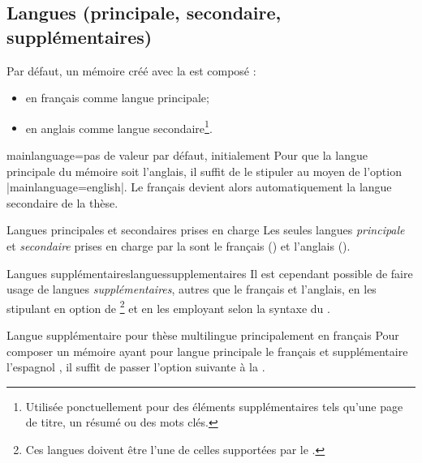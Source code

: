 %

\subsection{Langues (principale, secondaire,
  supplémentaires)}\label{sec-langues}

Par défaut, un mémoire créé avec la \yatCl est composé :
\begin{itemize}
\item en français comme langue principale;
\item en anglais comme langue secondaire\footnote{Utilisée ponctuellement pour
    des éléments supplémentaires tels qu'une page de titre, un résumé ou des
    mots clés.}.
\end{itemize}
%
\begin{docKey}{mainlanguage}{=\textbar{}}{pas
    de valeur par défaut, initialement }
  Pour que la langue principale  du mémoire soit
  l'anglais, il suffit de le stipuler au moyen de l'option
  |mainlanguage=english|. Le français devient alors automatiquement la langue
  secondaire de la thèse.
\end{docKey}

\begin{dbwarning}{Langues principales et secondaires prises en charge}{}
  Les seules langues \emph{principale} et \emph{secondaire} prises en charge
  par la \yatCl sont le français () et l'anglais
  ().
\end{dbwarning}

\begin{dbremark}{Langues supplémentaires}{languessupplementaires}
  Il est cependant possible de faire usage de langues \emph{supplémentaires},
  autres que le français et l'anglais, en les stipulant en option de
  \footnote{Ces langues doivent être l'une de
    celles supportées par le .} et en les employant selon la
  syntaxe du .
\end{dbremark}

\begin{dbexample}{Langue supplémentaire pour thèse
    multilingue principalement en français}{}
  Pour composer un mémoire ayant pour langue principale le français et
  supplémentaire l'espagnol , il suffit de passer l'option suivante à la \yatCl{}.
\end{dbexample}


